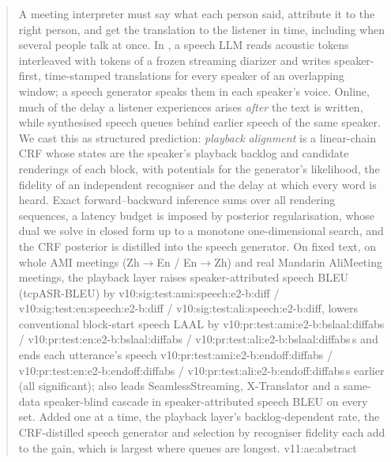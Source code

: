 \begin{abstract}
A meeting interpreter must say what each person said, attribute it to the right person, and get the translation to the
listener in time, including when several people talk at once. In \sys{}, a speech LLM reads acoustic tokens interleaved
with tokens of a frozen streaming diarizer and writes speaker-first, time-stamped translations for every speaker of an
overlapping window; a speech generator speaks them in each speaker's voice. Online, much of the delay a listener
experiences arises \emph{after} the text is written, while synthesised speech queues behind earlier speech of the same
speaker. We cast this as structured prediction: \emph{playback alignment} is a linear-chain CRF whose states are the
speaker's playback backlog and candidate renderings of each block, with potentials for the generator's likelihood, the
fidelity of an independent recogniser and the delay at which every word is heard. Exact forward--backward inference
sums over all rendering sequences, a latency budget is imposed by posterior regularisation, whose dual we solve in
closed form up to a monotone one-dimensional search, and the CRF posterior is distilled into the speech generator. On
fixed text, on whole AMI meetings (Zh$\rightarrow$En / En$\rightarrow$Zh) and real Mandarin AliMeeting meetings, the
playback layer raises speaker-attributed speech BLEU (tcpASR-BLEU) by \num{v10:sig:test:ami:speech:e2-b:diff} /
\num{v10:sig:test:en:speech:e2-b:diff} / \num{v10:sig:test:ali:speech:e2-b:diff}, lowers conventional block-start
speech LAAL by \num{v10:pr:test:ami:e2-b:bslaal:diffabs} / \num{v10:pr:test:en:e2-b:bslaal:diffabs} /
\num{v10:pr:test:ali:e2-b:bslaal:diffabs}\,s and ends each utterance's speech
\num{v10:pr:test:ami:e2-b:endoff:diffabs} / \num{v10:pr:test:en:e2-b:endoff:diffabs} /
\num{v10:pr:test:ali:e2-b:endoff:diffabs}\,s earlier (all significant); \sys{} also leads SeamlessStreaming,
X-Translator and a same-data speaker-blind cascade in speaker-attributed speech BLEU on every set. Added one at a time, the playback layer's backlog-dependent rate, the
CRF-distilled speech generator and selection by recogniser fidelity each add to the gain, which is largest where queues
are longest.\ifAliEval{} \num{v11:ae:abstract}\fi
\end{abstract}
